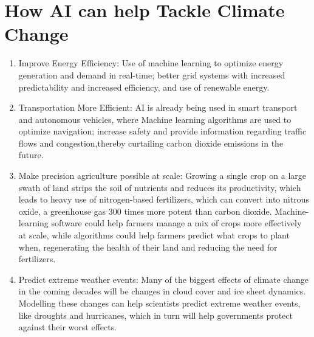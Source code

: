 \documentclass{article}
\begin{document}
\section*{How AI can help Tackle Climate Change}

\begin{enumerate}

\item Improve Energy Efficiency:
Use of machine learning to optimize energy generation and demand in real-time; better grid systems with increased predictability and increased efficiency, and use of renewable energy. 

\item Transportation More Efficient: 
AI is already being used in smart transport and autonomous vehicles, where Machine learning algorithms are used to optimize navigation; increase safety and provide information regarding traffic flows and congestion,thereby curtailing carbon dioxide emissions in the future. 


\item Make precision agriculture possible at scale: 
Growing a single crop on a large swath of land strips the soil of nutrients and reduces its productivity, which leads to heavy use of nitrogen-based fertilizers, which can convert into nitrous oxide, a greenhouse gas 300 times more potent than carbon dioxide. Machine-learning software could help farmers manage a mix of crops more effectively at scale, while algorithms could help farmers predict what crops to plant when, regenerating the health of their land and reducing the need for fertilizers.

\item Predict extreme weather events: Many of the biggest effects of climate change in the coming decades will be changes in cloud cover and ice sheet dynamics. Modelling these changes can help scientists predict extreme weather events, like droughts and hurricanes, which in turn will help governments protect against their worst effects.


\end{enumerate}
\end{document}
